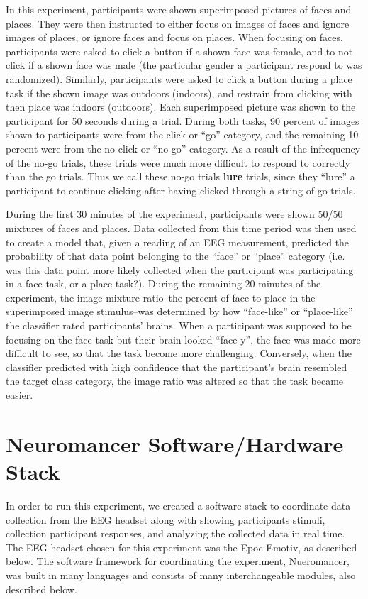 \documentclass[12pt]{report}
\begin{document}
	In this experiment, participants were shown superimposed pictures of faces and places.  They were then instructed to either focus on images of faces and ignore images of places, or ignore faces and focus on  places.  When focusing on faces, participants were asked to click a button if a shown face was female, and to not click if a shown face was male (the particular gender a participant respond to was randomized).  Similarly, participants were asked to click a button during a place task if the shown image was outdoors (indoors), and restrain from clicking with then place was indoors (outdoors).  Each superimposed picture was shown to the participant for 50 seconds during a trial.  During both tasks, 90 percent of images shown to participants were from the click or “go” category, and the remaining 10 percent were from the no click or “no-go” category.  As a result of the infrequency of the no-go trials, these trials were much more difficult to respond to correctly than the go trials. Thus we call these no-go trials {\bf lure} trials, since they “lure” a participant to continue clicking after having clicked through a string of go trials.  

	During the first 30 minutes of the experiment, participants were shown 50/50 mixtures of faces and places.  Data collected from this time period was then used to create a model that, given a reading of an EEG measurement, predicted the probability of that data point belonging to the “face” or “place” category (i.e. was this data point more likely collected when the participant was participating in a face task, or a place task?).  During the remaining 20 minutes of the experiment, the image mixture ratio--the percent of face to place in the superimposed image stimulus--was determined by how ``face-like'' or ``place-like'' the classifier rated participants' brains.  When a participant was supposed to be focusing on the face task but their brain looked ``face-y'', the face was made more difficult to see, so that the task become more challenging.  Conversely, when the classifier predicted with high confidence that the participant's brain resembled the target class category, the image ratio was altered so that the task became easier.

\chapter{Neuromancer Software/Hardware Stack}

In order to run this experiment, we created a software stack to coordinate data collection from the EEG headset along with showing participants stimuli, collection participant responses, and analyzing the collected data in real time.  The EEG headset chosen for this experiment was the Epoc Emotiv, as described below.  The software framework for coordinating the experiment, Nueromancer, was built in many languages and consists of many interchangeable modules, also described below.
\end{document}

